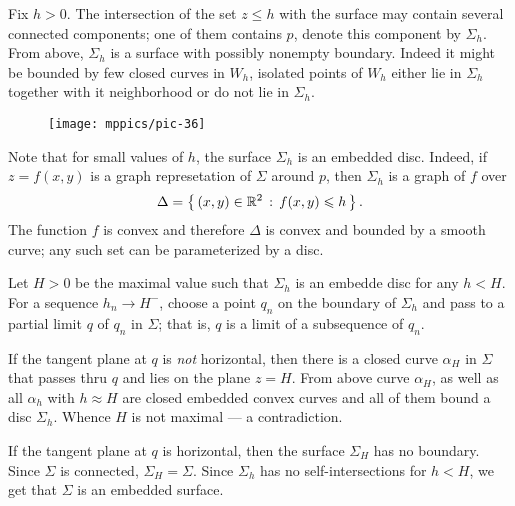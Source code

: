 Fix $h>0$.
The intersection of the set $z\le h$ with the surface may contain several connected components;
one of them contains $p$, denote this component by $\Sigma_h$.
From above, $\Sigma_h$ is a surface with possibly nonempty boundary.
Indeed it might be bounded by few closed curves in $W_h$, isolated points of $W_h$ either lie in $\Sigma_h$ together with it neighborhood or do not lie in $\Sigma_h$.

\begin{wrapfigure}{r}{30 mm}
\vskip-0mm
\centering
\texttt{[image: mppics/pic-36]}
\vskip-0mm
\end{wrapfigure}

Note that for small values of $h$, the surface $\Sigma_h$ is an embedded disc.
Indeed, if $z=f(x,y)$ is a graph represetation of $\Sigma$ around $p$,
then $\Sigma_h$ is a graph of $f$ over 
\[\Delta=\left\{\,{(x,y)\in\mathbb{R}^2}\,:\,{f(x,y)\leqslant h}\,\right\}.\]
The function $f$ is convex and therefore $\Delta$ is convex and bounded by a smooth curve;
any such set can be parameterized by a disc.

Let $H>0$ be the maximal value such that $\Sigma_h$ is an embedde disc for any $h<H$.
For a sequence $h_n\to H^-$, choose a point $q_n$ on the boundary of $\Sigma_h$ and pass to a partial limit $q$ of $q_n$ in $\Sigma$;
that is, $q$ is a limit of a subsequence of $q_n$.

If the tangent plane at $q$ is \emph{not} horizontal, 
then there is a closed curve $\alpha_H$ in $\Sigma$ that passes thru $q$ and lies on the plane $z=H$.
From above curve $\alpha_H$, as well as all $\alpha_h$ with $h\approx H$ are closed embedded convex curves and all of them bound a disc $\Sigma_h$.
Whence $H$ is not maximal --- a contradiction.

If the tangent plane at $q$ is horizontal,
then the surface $\Sigma_H$ has no boundary.
Since $\Sigma$ is connected, $\Sigma_H=\Sigma$.
Since $\Sigma_h$ has no self-intersections for $h<H$, we get that $\Sigma$ is an embedded surface.
\qeds

